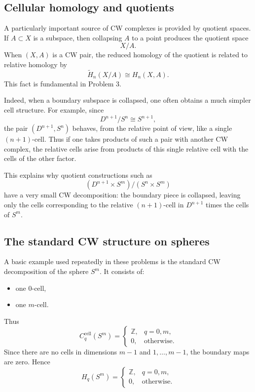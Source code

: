 \documentclass[12pt,a4paper]{article}
\theoremstyle{notespace}
\begin{document}
\subsection{Cellular homology and quotients}

A particularly important source of CW complexes is provided by quotient spaces. If \(A\subset X\) is a subspace, then collapsing \(A\) to a point produces the quotient space
\[
X/A.
\]
When \((X,A)\) is a CW pair, the reduced homology of the quotient is related to relative homology by
\[
\widetilde H_n(X/A)\cong H_n(X,A).
\]
This fact is fundamental in Problem 3.

Indeed, when a boundary subspace is collapsed, one often obtains a much simpler cell structure. For example, since
\[
D^{n+1}/S^n \cong S^{n+1},
\]
the pair \((D^{n+1},S^n)\) behaves, from the relative point of view, like a single \((n+1)\)-cell. Thus if one takes products of such a pair with another CW complex, the relative cells arise from products of this single relative cell with the cells of the other factor.

This explains why quotient constructions such as
\[
(D^{n+1}\times S^m)/(S^n\times S^m)
\]
have a very small CW decomposition: the boundary piece is collapsed, leaving only the cells corresponding to the relative \((n+1)\)-cell in \(D^{n+1}\) times the cells of \(S^m\).

\subsection{The standard CW structure on spheres}

A basic example used repeatedly in these problems is the standard CW decomposition of the sphere \(S^m\). It consists of:
\begin{itemize}
	\item one \(0\)-cell,
	\item one \(m\)-cell.
\end{itemize}
Thus
\[
C_q^{\mathrm{cell}}(S^m)=
\begin{cases}
	\mathbb Z, & q=0,m,\\
	0, & \text{otherwise}.
\end{cases}
\]
Since there are no cells in dimensions \(m-1\) and \(1,\dots,m-1\), the boundary maps are zero. Hence
\[
H_q(S^m)=
\begin{cases}
	\mathbb Z, & q=0,m,\\
	0, & \text{otherwise}.
\end{cases}
\]
\end{document}
